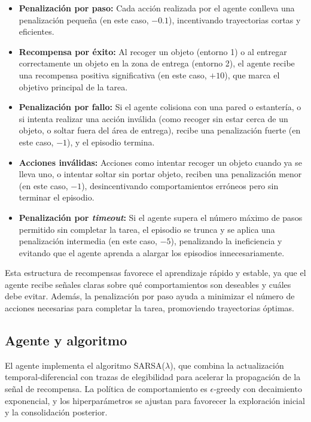 \documentclass[a4paper,12pt]{article}
\begin{document}
\begin{itemize}
    \item \textbf{Penalización por paso:} Cada acción realizada por el agente conlleva una penalización pequeña (en este caso, $-0.1$), incentivando trayectorias cortas y eficientes.
    \item \textbf{Recompensa por éxito:} Al recoger un objeto (entorno 1) o al entregar correctamente un objeto en la zona de entrega (entorno 2), el agente recibe una recompensa positiva significativa (en este caso, $+10$), que marca el objetivo principal de la tarea.
    \item \textbf{Penalización por fallo:} Si el agente colisiona con una pared o estantería, o si intenta realizar una acción inválida (como recoger sin estar cerca de un objeto, o soltar fuera del área de entrega), recibe una penalización fuerte (en este caso, $-1$), y el episodio termina.
    \item \textbf{Acciones inválidas:} Acciones como intentar recoger un objeto cuando ya se lleva uno, o intentar soltar sin portar objeto, reciben una penalización menor (en este caso, $-1$), desincentivando comportamientos erróneos pero sin terminar el episodio.
    \item \textbf{Penalización por \textit{timeout}:} Si el agente supera el número máximo de pasos permitido sin completar la tarea, el episodio se trunca y se aplica una penalización intermedia (en este caso, $-5$), penalizando la ineficiencia y evitando que el agente aprenda a alargar los episodios innecesariamente.
\end{itemize}

Esta estructura de recompensas favorece el aprendizaje rápido y estable, ya que el agente recibe señales claras sobre qué comportamientos son deseables y cuáles debe evitar. Además, la penalización por paso ayuda a minimizar el número de acciones necesarias para completar la tarea, promoviendo trayectorias óptimas.

\subsection{Agente y algoritmo}

El agente implementa el algoritmo SARSA($\lambda$), que combina la actualización temporal-diferencial con trazas de elegibilidad para acelerar la propagación de la señal de recompensa. La política de comportamiento es $\epsilon$-greedy con decaimiento exponencial, y los hiperparámetros se ajustan para favorecer la exploración inicial y la consolidación posterior.
\end{document}
